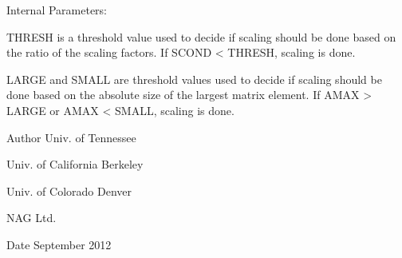\begin{DoxyParagraph}{Internal Parameters\+: }
\begin{DoxyVerb}  THRESH is a threshold value used to decide if scaling should be done
  based on the ratio of the scaling factors.  If SCOND < THRESH,
  scaling is done.

  LARGE and SMALL are threshold values used to decide if scaling should
  be done based on the absolute size of the largest matrix element.
  If AMAX > LARGE or AMAX < SMALL, scaling is done.\end{DoxyVerb}
 
\end{DoxyParagraph}
\begin{DoxyAuthor}{Author}
Univ. of Tennessee 

Univ. of California Berkeley 

Univ. of Colorado Denver 

N\+A\+G Ltd. 
\end{DoxyAuthor}
\begin{DoxyDate}{Date}
September 2012 
\end{DoxyDate}
